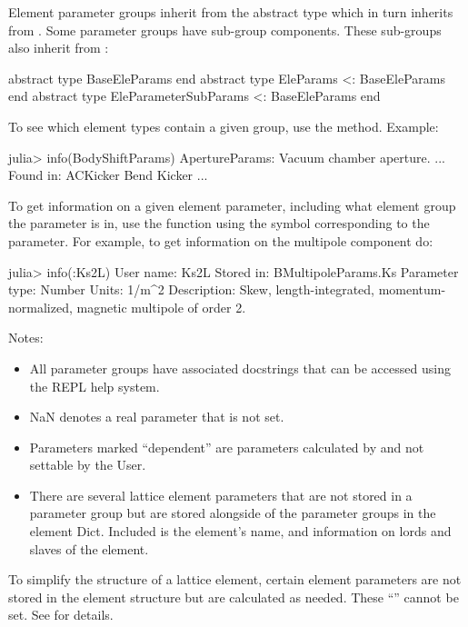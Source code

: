 Element parameter groups inherit from the abstract type  which
in turn inherits from . Some
parameter groups have sub-group components. 
These sub-groups also inherit from :
\begin{example}
  abstract type BaseEleParams end
  abstract type EleParams <: BaseEleParams end
  abstract type EleParameterSubParams <: BaseEleParams end
\end{example}

To see which element types contain a given group, use the 
method. Example:
\begin{example}
  julia> info(BodyShiftParams)
  ApertureParams: Vacuum chamber aperture.
  ...
  Found in:
    ACKicker
    Bend
    Kicker
    ...
\end{example}

To get information on a given element parameter, including what element group the parameter is in,
use the  function using the symbol corresponding to the parameter. For example,
to get information on the multipole component  do:
\begin{example}
  julia> info(:Ks2L)
    User name:       Ks2L
    Stored in:       BMultipoleParams.Ks
    Parameter type:  Number
    Units:           1/m^2
    Description:     Skew, length-integrated, momentum-normalized, 
                                          magnetic multipole of order 2.
\end{example}
  
Notes:
\begin{itemize}
%
\item
All parameter groups have associated docstrings that can be accessed using the REPL help system.
%
\item
NaN denotes a real parameter that is not set.
%
\item
Parameters marked ``dependent'' are parameters calculated by \accellat and not settable by the User.
%
\item
There are several lattice element parameters that are not stored in a parameter group but are stored
alongside of the parameter groups in the element Dict. Included is the element's name, and information
on lords and slaves of the element.
%
\end{itemize}

To simplify the structure of a lattice element, certain element parameters are not stored in the 
element structure but are calculated as needed. These ``'' cannot be set.
See  for details.

